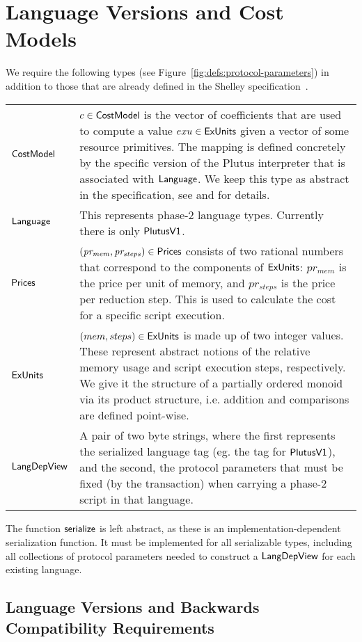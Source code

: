 \section{Language Versions and Cost Models}
\label{sec:protocol-parameters}

We require the following types (see Figure~\ref{fig:defs:protocol-parameters})
in addition to those that are already defined in the Shelley specification~\cite{shelley_spec}.

\vspace{12pt}
\begin{tabular}{lp{5in}}
  $\mathsf{CostModel}$ &
  $c\in\mathsf{CostModel}$ is the vector of coefficients that are used to compute
  a value $exu\in\mathsf{ExUnits}$ given a vector of some resource primitives. The mapping is defined
  concretely by the specific version of the Plutus interpreter that is associated with $\mathsf{Language}$.
  We keep this type as abstract in the specification, see \cite{plutuscore} and \cite{plutustech}
  for details.
  \\
  $\mathsf{Language}$ &
  This represents phase-2 language types. Currently there is only $\mathsf{PlutusV1}$.
  \\
  $\mathsf{Prices}$ &
  $\mathit{(pr_{mem}, pr_{steps})}\in \mathsf{Prices}$ consists of two rational numbers
  that correspond to the components of $\mathsf{ExUnits}$:
  $pr_{mem}$ is the price per unit of memory, and $pr_{steps}$ is the price per
  reduction step. This is used to calculate the cost for a specific script execution.
  \\
  $\mathsf{ExUnits}$ &
  $(mem, steps)\in \mathsf{ExUnits}$ is made up of two integer values.
  These represent abstract notions of the relative memory usage and script execution steps,
  respectively. We give it the structure of a partially ordered monoid via its product structure, i.e. addition and comparisons are defined point-wise.
  \\
  $\mathsf{LangDepView}$ &
  A pair of two byte strings, where the first represents the serialized language tag (eg. the tag for $\mathsf{PlutusV1}$),
  and the second, the protocol parameters that must be fixed (by the transaction) when carrying a phase-2 script
  in that language.
\end{tabular}

The function $\mathsf{serialize}$ is left abstract, as
these is an implementation-dependent serialization function. It must
be implemented for all serializable types, including all
collections of protocol parameters needed to construct a $\mathsf{LangDepView}$ for
each existing language.

\subsection{Language Versions and Backwards Compatibility Requirements}
\label{sec:versions}

